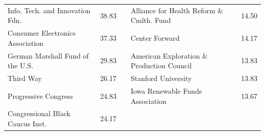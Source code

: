 \documentclass[12pt]{article}                           %
\begin{document}
\begin{table}[ht]
\begin{tabular}{@{}lllll@{}}
Info. Tech. and Innovation Fdn.      & 38.83                                                        &  & Alliance for Health Reform \& Cmlth. Fund   & 14.50                                                        \\
Consumer Electronics Association     & 37.33                                                        &  & Center Forward                              & 14.17                                                        \\
German Marshall Fund of the U.S.     & 29.83                                                        &  & American Exploration \& Production Council  & 13.83                                                        \\
Third Way                            & 26.17                                                        &  & Stanford University                         & 13.83                                                        \\
Progressive Congress                 & 24.83                                                        &  & Iowa Renewable Funds Association            & 13.67                                                        \\
Congressional Black Caucus Inst.     & 24.17                                                        &  &                                             &                                                              \\ \bottomrule
\end{tabular}
\end{table}
\end{document}
